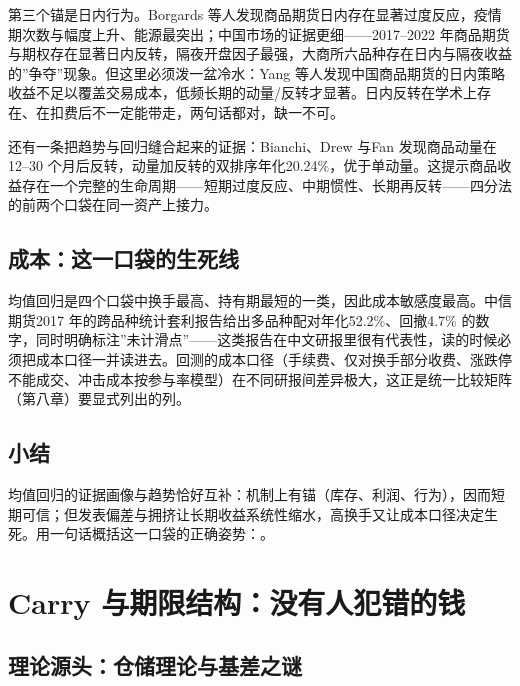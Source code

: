 \documentclass[12pt,a4paper]{ctexart}
\begin{document}
第三个锚是日内行为。Borgards 等人发现商品期货日内存在显著过度反应，疫情期次数与幅度上升、能源最突出\cite{38}；中国市场的证据更细——2017–2022 年商品期货与期权存在显著日内反转，隔夜开盘因子最强\cite{42}，大商所六品种存在日内与隔夜收益的”争夺”\hspace{0.3em}现象\cite{43}。但这里必须泼一盆冷水：Yang 等人发现中国商品期货的日内策略收益不足以覆盖交易成本，低频长期的动量/反转才显著\cite{77}。日内反转在学术上存在、在扣费后不一定能带走，两句话都对，缺一不可。


还有一条把趋势与回归缝合起来的证据：Bianchi、Drew 与Fan 发现商品动量在12–30 个月后反转，动量加反转的双排序年化20.24\%，优于单动量\cite{39}。这提示商品收益存在一个完整的生命周期——短期过度反应、中期惯性、长期再反转——四分法的前两个口袋在同一资产上接力。


\subsection{成本：这一口袋的生死线}

均值回归是四个口袋中换手最高、持有期最短的一类，因此成本敏感度最高。中信期货2017 年的跨品种统计套利报告给出多品种配对年化52.2\%、回撤4.7\% 的数字，同时明确标注”\hspace{0.3em}未计滑点”\hspace{0.3em}\cite{48}——这类报告在中文研报里很有代表性，读的时候必须把成本口径一并读进去。回测的成本口径（手续费、仅对换手部分收费、涨跌停不能成交、冲击成本按参与率模型）在不同研报间差异极大，这正是统一比较矩阵（第八章）要显式列出的列。


\subsection{小结}

均值回归的证据画像与趋势恰好互补：机制上有锚（库存、利润、行为），因而短期可信；但发表偏差与拥挤让长期收益系统性缩水\cite{35, 36}，高换手又让成本口径决定生死\cite{48}。用一句话概括这一口袋的正确姿势：。


\section{Carry 与期限结构：没有人犯错的钱}

\subsection{理论源头：仓储理论与基差之谜}
\end{document}
